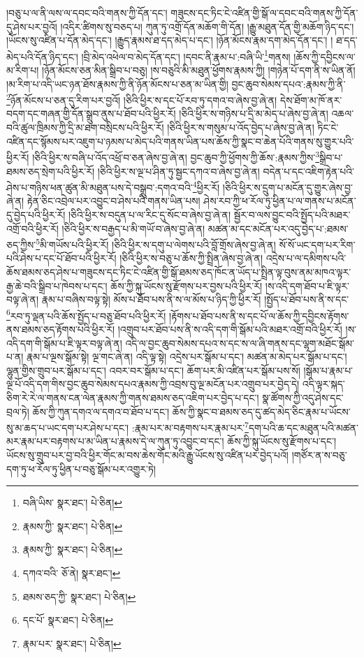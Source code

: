 །བཅུ་པ་ལ་ནི་ལས་ལ་དབང་བའི་གནས་ཀྱི་དོན་དང་། གཟུངས་དང་ཏིང་ངེ་འཛིན་གྱི་སྒོ་ལ་དབང་བའི་གནས་ཀྱི་དོན་དུ་ཤེས་པར་བྱའོ། །འདིར་ཚིགས་སུ་བཅད་པ། ཀུན་ཏུ་འགྲོ་དོན་མཆོག་གི་དོན། །རྒྱུ་མཐུན་དོན་གྱི་མཆོག་ཉིད་དང་། །ཡོངས་སུ་འཛིན་པ་དོན་མེད་དང་། །རྒྱུད་རྣམས་ཐ་དད་མེད་པ་དང་། །ཉོན་མོངས་རྣམ་དག་མེད་དོན་དང་། །
ཐ་དད་མེད་པའི་དོན་ཉིད་དང་། །བྲི་མེད་འཕེལ་བ་མེད་དོན་དང་། །དབང་ནི་རྣམ་པ་:བཞི་ཡི་\footnote{བཞི་ཡིས་  སྣར་ཐང་།  པེ་ཅིན། }གནས། །ཆོས་ཀྱི་དབྱིངས་ལ་མ་རིག་པ། །ཉོན་མོངས་ཅན་མིན་སྒྲིབ་པ་བཅུ། །ས་བཅུའི་མི་མཐུན་ཕྱོགས་རྣམས་ཀྱི། །གཉེན་པོ་དག་ནི་ས་ཡིན་ནོ། །མ་རིག་པ་འདི་ཡང་ཉན་ཐོས་རྣམས་ཀྱི་ནི་ཉོན་མོངས་པ་ཅན་མ་ཡིན་གྱི། བྱང་ཆུབ་སེམས་དཔའ་:རྣམས་ཀྱི་ནི་\footnote{རྣམས་ཀྱི་  སྣར་ཐང་།  པེ་ཅིན། }ཉོན་མོངས་པ་ཅན་དུ་རིག་པར་བྱའོ། །ཅིའི་ཕྱིར་ས་དང་པོ་རབ་ཏུ་དགའ་བ་ཞེས་བྱ་ཞེ་ན། དེས་ཐོག་མ་ཁོ་ནར་བདག་དང་གཞན་གྱི་དོན་སྒྲུབ་ནུས་པ་ཐོབ་པའི་ཕྱིར་རོ། །ཅིའི་ཕྱིར་ས་གཉིས་པ་དྲི་མ་མེད་པ་ཞེས་བྱ་ཞེ་ན། འཆལ་བའི་ཚུལ་ཁྲིམས་ཀྱི་དྲི་མ་ཐག་བསྲིངས་པའི་ཕྱིར་རོ། །ཅིའི་ཕྱིར་ས་གསུམ་པ་འོད་བྱེད་པ་ཞེས་བྱ་ཞེ་ན། ཏིང་ངེ་འཛིན་དང་སྙོམས་པར་འཇུག་པ་ཉམས་པ་མེད་པའི་གནས་ཡིན་པས་ཆོས་ཀྱི་སྣང་བ་ཆེན་པོའི་གནས་སུ་གྱུར་པའི་ཕྱིར་རོ། །ཅིའི་ཕྱིར་ས་བཞི་པ་འོད་འཕྲོ་བ་ཅན་ཞེས་བྱ་ཞེ་ན། བྱང་ཆུབ་ཀྱི་ཕྱོགས་ཀྱི་ཆོས་:རྣམས་ཀྱིས་\footnote{རྣམས་ཀྱི་  སྣར་ཐང་།  པེ་ཅིན། }སྒྲིབ་པ་ཐམས་ཅད་སྲེག་པའི་ཕྱིར་རོ། །ཅིའི་ཕྱིར་ས་ལྔ་པ་ཤིན་ཏུ་སྦྱང་དཀའ་བ་ཞེས་བྱ་ཞེ་ན། བདེན་པ་དང་འཇིག་རྟེན་པའི་ཤེས་པ་གཉིས་ཕན་ཚུན་མི་མཐུན་པས་དེ་བསྒྲུབ་:དགའ་བའི་\footnote{དཀའ་བའི་  ཅོ་ནེ།  སྣར་ཐང་། }ཕྱིར་རོ། །ཅིའི་ཕྱིར་ས་དྲུག་པ་མངོན་དུ་གྱུར་ཞེས་བྱ་ཞེ་ན། རྟེན་ཅིང་འབྲེལ་པར་འབྱུང་བ་ཤེས་པའི་གནས་ཡིན་པས། ཤེས་རབ་ཀྱི་ཕ་རོལ་ཏུ་ཕྱིན་པ་ལ་གནས་པ་མངོན་དུ་བྱེད་པའི་ཕྱིར་རོ། །ཅིའི་ཕྱིར་ས་བདུན་པ་ལ་རིང་དུ་སོང་བ་ཞེས་བྱ་ཞེ་ན། སྦྱོར་བ་ལས་བྱུང་བའི་སྤྱོད་པའི་མཐར་འགྲོ་བའི་ཕྱིར་རོ། །ཅིའི་ཕྱིར་ས་བརྒྱད་པ་མི་གཡོ་བ་ཞེས་བྱ་ཞེ་ན། མཚན་མ་དང་མངོན་པར་འདུ་བྱེད་པ་:ཐམས་ཅད་ཀྱིས་\footnote{ཐམས་ཅད་ཀྱི་  སྣར་ཐང་།  པེ་ཅིན། }མི་གཡོས་པའི་ཕྱིར་རོ། །ཅིའི་ཕྱིར་ས་དགུ་པ་ལེགས་པའི་བློ་གྲོས་ཞེས་བྱ་ཞེ་ན། སོ་སོ་ཡང་དག་པར་རིག་པའི་ཤེས་པ་དང་པོ་ཐོབ་པའི་ཕྱིར་རོ། །ཅིའི་ཕྱིར་ས་བཅུ་པ་ཆོས་ཀྱི་སྤྲིན་ཞེས་བྱ་ཞེ་ན། འདྲེས་པ་ལ་དམིགས་པའི་ཆོས་ཐམས་ཅད་ཤེས་པ་གཟུངས་དང་ཏིང་ངེ་འཛིན་གྱི་སྒོ་ཐམས་ཅད་ཁོང་ན་ཡོད་པ་སྤྲིན་ལྟ་བུས་ནམ་མཁའ་ལྟར་རྒྱ་ཆེ་བའི་སྒྲིབ་པ་ཁེབས་པ་དང་། ཆོས་ཀྱི་སྐུ་ཡོངས་སུ་རྫོགས་པར་བྱས་པའི་ཕྱིར་རོ། །ས་འདི་དག་ཐོབ་པ་ཇི་ལྟར་བལྟ་ཞེ་ན། རྣམ་པ་བཞིས་བལྟ་སྟེ། མོས་པ་ཐོབ་པས་ནི་ས་ལ་མོས་པ་ཉིད་ཀྱི་ཕྱིར་རོ། །སྤྱོད་པ་ཐོབ་པས་ནི་ས་དང་\footnote{དང་པོ་  སྣར་ཐང་།  པེ་ཅིན། }རབ་ཏུ་ལྡན་པའི་ཆོས་སྤྱོད་པ་བཅུ་ཐོབ་པའི་ཕྱིར་རོ། །རྟོགས་པ་ཐོབ་པས་ནི་ས་དང་པོ་ལ་ཆོས་ཀྱི་དབྱིངས་རྟོགས་ནས་ཐམས་ཅད་རྟོགས་པའི་ཕྱིར་རོ། །འགྲུབ་པར་ཐོབ་པས་ནི་ས་འདི་དག་གི་སྒོམ་པའི་མཐར་འགྲོ་བའི་ཕྱིར་རོ། །ས་འདི་དག་གི་སྒོམ་པ་ཇི་ལྟར་བལྟ་ཞེ་ན། འདི་ལ་བྱང་ཆུབ་སེམས་དཔའ་ས་དང་ས་ལ་ཞི་གནས་དང་ལྷག་མཐོང་སྒོམ་པ་ན། རྣམ་པ་ལྔས་སྒོམ་སྟེ། ལྔ་གང་ཞེ་ན། འདི་ལྟ་སྟེ། འདྲེས་པར་སྒོམ་པ་དང་། མཚན་མ་མེད་པར་སྒོམ་པ་དང་། ལྷུན་གྱིས་གྲུབ་པར་སྒོམ་པ་དང་། འབར་བར་སྒོམ་པ་དང་། ཆོག་པར་མི་འཛིན་པར་སྒོམ་པས་སོ། །སྒོམ་པ་རྣམ་པ་ལྔ་པོ་འདི་དག་གིས་བྱང་ཆུབ་སེམས་དཔའ་རྣམས་ཀྱི་འབྲས་བུ་ལྔ་མངོན་པར་འགྲུབ་པར་བྱེད་དེ། འདི་ལྟར་སྐད་ཅིག་རེ་རེ་ལ་གནས་ངན་ལེན་རྣམས་ཀྱི་གནས་ཐམས་ཅད་འཇིག་པར་བྱེད་པ་དང་། སྣ་ཚོགས་ཀྱི་འདུ་ཤེས་དང་བྲལ་ཏེ། ཆོས་ཀྱི་ཀུན་དགའ་ལ་དགའ་བ་ཐོབ་པ་དང་། ཆོས་ཀྱི་སྣང་བ་ཐམས་ཅད་དུ་ཚད་མེད་ཅིང་རྣམ་པ་ཡོངས་སུ་མ་ཆད་པ་ཡང་དག་པར་ཤེས་པ་དང་། :རྣམ་པར་མ་བརྟགས་པར་རྣམ་པར་\footnote{རྣམ་པར་  སྣར་ཐང་།  པེ་ཅིན། }དག་པའི་ཆ་དང་མཐུན་པའི་མཚན་མར་རྣམ་པར་བརྟགས་པ་མ་ཡིན་པ་རྣམས་དེ་ལ་ཀུན་ཏུ་འབྱུང་བ་དང་། ཆོས་ཀྱི་སྐུ་ཡོངས་སུ་རྫོགས་པ་དང་། ཡོངས་སུ་གྲུབ་པར་བྱ་བའི་ཕྱིར་གོང་མ་བས་ཆེས་གོང་མའི་རྒྱུ་ཡོངས་སུ་འཛིན་པར་བྱེད་པའོ། །གཙོར་ན་ས་བཅུ་དག་ཏུ་ཕ་རོལ་ཏུ་ཕྱིན་པ་བཅུ་སྒོམ་པར་འགྱུར་ཏེ། 